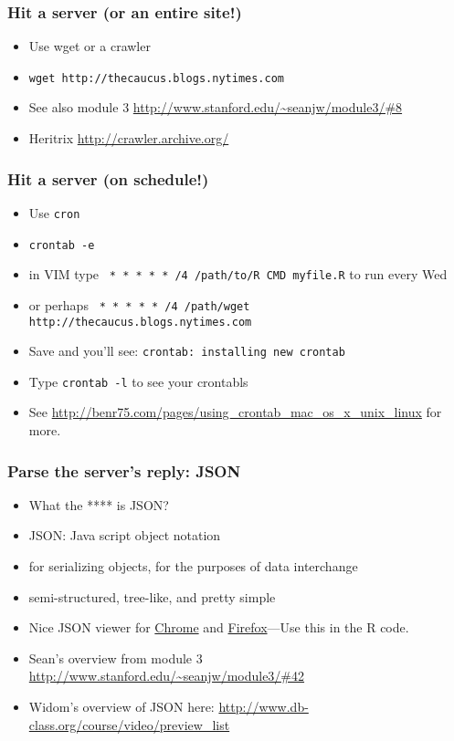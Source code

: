 \documentclass[]{beamer}
\begin{document}
\begin{frame}
\frametitle{Hit a server (or an entire site!)}   %
\begin{itemize}
  \item Use wget or a crawler
  \item \verb~wget http://thecaucus.blogs.nytimes.com~
  \item See also module 3 \url{http://www.stanford.edu/~seanjw/module3/\#8}
  \item Heritrix \url{http://crawler.archive.org/}
\end{itemize}
\end{frame}

\begin{frame}
\frametitle{Hit a server (on schedule!)}   %
\begin{itemize}
  \item Use \verb~cron~
  \item \verb~crontab -e~
  \item in VIM type \verb~ * * * * * /4 /path/to/R CMD myfile.R~ to run every Wed
  \item or perhaps \verb~ * * * * * /4 /path/wget http://thecaucus.blogs.nytimes.com~
  \item Save and you'll see: \verb~crontab: installing new crontab~
  \item Type \verb~crontab -l~ to see your crontabls
  \item See \url{http://benr75.com/pages/using_crontab_mac_os_x_unix_linux} for more.
\end{itemize}
\end{frame}

\begin{frame}
\frametitle{Parse the server's reply: JSON}   %
\begin{itemize}
  \item What the **** is JSON?
  \item JSON: Java script object notation
  \item for serializing objects, for the purposes of data interchange
  \item semi-structured, tree-like, and pretty simple
  \item Nice JSON viewer for \href{https://chrome.google.com/webstore/detail/chklaanhfefbnpoihckbnefhakgolnmc}{\color{blue} Chrome} and \href{https://addons.mozilla.org/en-US/firefox/addon/jsonview/}{\color{blue} Firefox}---Use this in the R code.
  \item Sean's overview from module 3 \url{http://www.stanford.edu/~seanjw/module3/\#42}
  \item Widom's overview of JSON here: \url{http://www.db-class.org/course/video/preview_list}
\end{itemize}

\end{frame}
\end{document}
